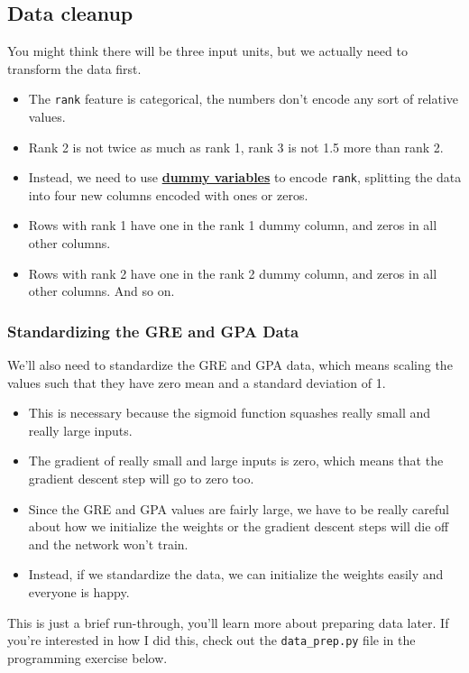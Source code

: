 \subsection{Data cleanup}

You might think there will be three input units, but we actually need to transform the data first.

\begin{itemize}
    \item The \verb|rank| feature is categorical, the numbers don't encode any sort of relative values.
    \item Rank 2 is not twice as much as rank 1, rank 3 is not 1.5 more than rank 2.
    \item Instead, we need to use \href{https://en.wikipedia.org/wiki/Dummy_variable_(statistics)}{\textbf{dummy variables}} to encode \verb|rank|, splitting the data into four new columns encoded with ones or zeros.
    \item Rows with rank 1 have one in the rank 1 dummy column, and zeros in all other columns.
    \item Rows with rank 2 have one in the rank 2 dummy column, and zeros in all other columns. And so on.
\end{itemize}

\subsubsection{Standardizing the GRE and GPA Data}

We'll also need to standardize the GRE and GPA data, which means scaling the values such that they have zero mean and a standard deviation of 1.

\begin{itemize}
    \item This is necessary because the sigmoid function squashes really small and really large inputs.
    \item The gradient of really small and large inputs is zero, which means that the gradient descent step will go to zero too.
    \item Since the GRE and GPA values are fairly large, we have to be really careful about how we initialize the weights or the gradient descent steps will die off and the network won't train.
    \item Instead, if we standardize the data, we can initialize the weights easily and everyone is happy.
\end{itemize}
This is just a brief run-through, you'll learn more about preparing data later. If you're interested in how I did this, check out the \verb|data_prep.py| file in the programming exercise below.

